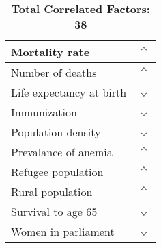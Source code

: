 \documentclass[12pt,notitlepage,oneside]{report}
\begin{document}
\begin{table}[!htb]
\begin{tabular}{|l|l|}
Mortality rate & $\Uparrow$\\ \hline
Number of deaths & $\Uparrow$\\ \hline
Life expectancy at birth & $\Downarrow$\\ \hline
Immunization & $\Downarrow$\\ \hline
Population density & $\Downarrow$\\ \hline
Prevalance of anemia & $\Uparrow$\\ \hline
Refugee population & $\Uparrow$\\ \hline
Rural population & $\Uparrow$\\ \hline
Survival to age 65 & $\Downarrow$\\ \hline
Women in parliament & $\Downarrow$\\ \hline
\end{tabular}
\caption*{\textbf{Total Correlated Factors: 38}}
\end{table}
\clearpage
\end{document}
